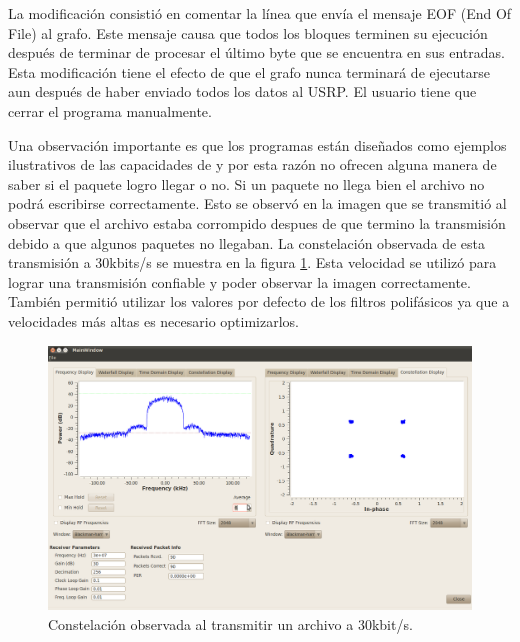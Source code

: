 La modificaci\'on consisti\'o en comentar la l\'inea que env\'ia el mensaje EOF (End Of File) al
grafo. Este mensaje causa que todos los bloques terminen su ejecuci\'on despu\'es de terminar de
procesar el \'ultimo byte que se encuentra en sus entradas. Esta modificaci\'on tiene el efecto de
que el grafo nunca terminar\'a de ejecutarse aun despu\'es de haber enviado todos los datos al USRP.
El usuario tiene que cerrar el programa manualmente.

Una observaci\'on importante es que los programas est\'an dise\~nados como ejemplos ilustrativos de
las capacidades de \gnuradio y por esta raz\'on no ofrecen alguna manera de saber si el paquete
logro llegar o no. Si un paquete no llega bien el archivo no podr\'a escribirse correctamente. Esto
se observ\'o en la imagen que se transmiti\'o al observar que el archivo estaba corrompido
despues de que termino la transmisi\'on debido a que algunos paquetes no llegaban. La
constelaci\'on observada de esta transmisi\'on a 30kbits/s se muestra en la figura \ref{fig:fileconst}.
Esta velocidad se utiliz\'o para lograr una transmisi\'on confiable y poder observar la imagen
correctamente. Tambi\'en permiti\'o utilizar los valores por defecto de los filtros polif\'asicos
ya que a velocidades m\'as altas es necesario optimizarlos.

\begin{figure}[htp]
  \centering
  \includegraphics[width=5.8in]{figs/fileconst}
  \vspace{0.3in}
  \caption{Constelaci\'on observada al transmitir un archivo a 30kbit/s.}
  \label{fig:fileconst}
\end{figure}
